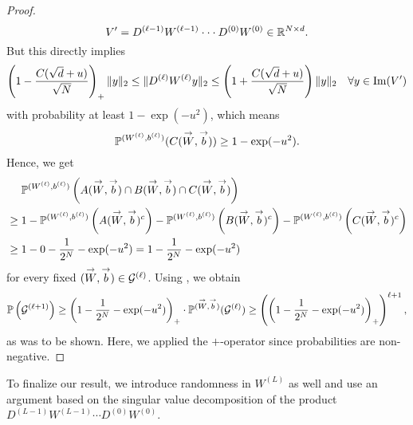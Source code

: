 \begin{proof}
\begin{equation*}
V' =  D^{(\ell-1)} W^{(\ell-1)} \cdot \cdot \cdot D^{(0)} W^{(0)} \in \mathbb{R}^{N \times d}.
\end{equation*}
But this directly implies
\begin{equation*}
\left(1- \frac{C(\sqrt{d} + u)}{\sqrt{N}}\right)_+ \Vert y \Vert_2 \leq \Vert D^{(\ell)}W^{(\ell)}y \Vert_2 \leq \left(1+ \frac{C(\sqrt{d} + u)}{\sqrt{N}}\right) \Vert y \Vert_2 \quad \forall y \in \operatorname{Im}(V')
\end{equation*}
with probability at least $1 - \exp(-u^2)$, which means
\begin{equation*}
\mathbb{P}^{(W^{(\ell)}, b^{(\ell)})} (C (\overset{\rightarrow}{W}, \overset{\rightarrow}{b})) \geq 1-  \exp(-u^2).
\end{equation*}
Hence, we get
\begin{align*}
&\norel\PP^{(W^{(\ell)}, b^{(\ell)})} \left(A (\overset{\rightarrow}{W}, \overset{\rightarrow}{b}) \cap B(\arrow{W}, \arrow{b}) \cap C(\arrow{W}, \arrow{b})\right) \\
&\geq 1 -  \PP^{(W^{(\ell)}, b^{(\ell)})}\left(A (\overset{\rightarrow}{W}, \overset{\rightarrow}{b})^c\right) - \PP^{(W^{(\ell)}, b^{(\ell)})}\left(B (\overset{\rightarrow}{W}, \overset{\rightarrow}{b})^c\right) - \PP^{(W^{(\ell)}, b^{(\ell)})}\left(C (\overset{\rightarrow}{W}, \overset{\rightarrow}{b})^c\right) \\
&\geq 1 - 0 - \frac{1}{2^N} - \exp(-u^2) = 1 - \frac{1}{2^N} -\exp(-u^2)
\end{align*}
for every fixed $(\overset{\rightarrow}{W}, \overset{\rightarrow}{b}) \in \mathcal{G}^{(\ell)}$.
Using , we obtain
\begin{align*}
\mathbb{P} \left(\mathcal{G}^{(\ell+1)} \right) \geq \left(1 - \frac{1}{2^N} -\exp(-u^2)\right)_+ \cdot \mathbb{P}^{(\overset{\rightarrow}{W}, \overset{\rightarrow}{b})}(\mathcal{G}^{(\ell)}) \geq \left(\left(1 - \frac{1}{2^N} -\exp(-u^2)\right)_+\right)^{\ell + 1},
\end{align*}
as was to be shown. Here, we applied the $+$-operator since probabilities are non-negative. 
\end{proof}
To finalize our result, we introduce randomness in $W^{(L)}$ as well and use an argument based on the singular value decomposition of the product $D^{(L-1)}W^{(L-1)} \cdots D^{(0)}W^{(0)}$.
